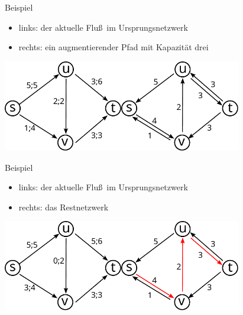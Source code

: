\documentclass[aspectratio=1610, 11pt]{beamer}
\begin{document}
\begin{frame}
\begin{overprint}
\begin{exampleblock}{Beispiel}
			\begin{itemize}
				\item links: der aktuelle Flu\ss\ im Ursprungsnetzwerk
				\item rechts: ein augmentierender Pfad mit Kapazit\"at drei
			\end{itemize}
		\end{exampleblock}
		\includegraphics[height=40mm]{./images/flow12.pdf}\hfill\includegraphics[height=40mm]{./images/flow13.pdf}
\begin{exampleblock}{Beispiel}
			\begin{itemize}
				\item links: der aktuelle Flu\ss\ im Ursprungsnetzwerk
				\item rechts: das Restnetzwerk
			\end{itemize}
		\end{exampleblock}
		\includegraphics[height=40mm]{./images/flow15.pdf}\hfill\includegraphics[height=40mm]{./images/flow14.pdf}

\end{overprint}
\end{frame}
\end{document}
